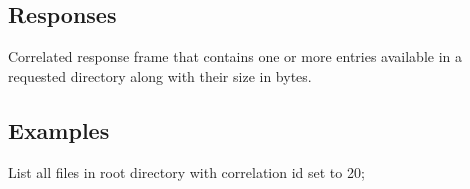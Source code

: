 \subsection{Responses}
Correlated response frame that contains one or more entries available in a requested directory along with
their size in bytes.



\subsection{Examples}
List all files in root directory with correlation id set to 20; 


